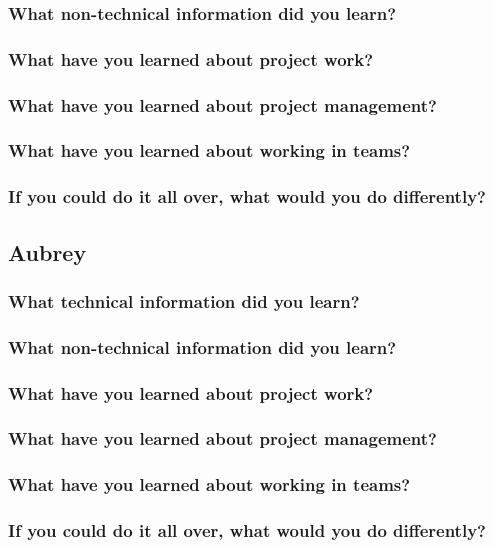 \documentclass[journal,10pt,onecolumn,compsoc]{IEEEtran}
\begin{document}
    \subsubsection{What non-technical information did you learn?}
    \subsubsection{What have you learned about project work?}
    \subsubsection{What have you learned about project management?}
    \subsubsection{What have you learned about working in teams?}
    \subsubsection{If you could do it all over, what would you do differently?} 
    \subsection{Aubrey}
    \subsubsection{What technical information did you learn?}    
    \subsubsection{What non-technical information did you learn?}
    \subsubsection{What have you learned about project work?}
    \subsubsection{What have you learned about project management?}
    \subsubsection{What have you learned about working in teams?}
    \subsubsection{If you could do it all over, what would you do differently?} 
\end{document}
